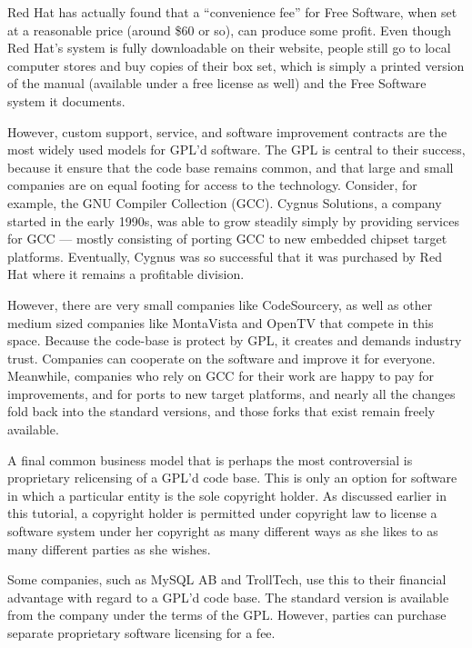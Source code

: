 \documentclass[12pt]{report}
\begin{document}
Red Hat has actually found that a ``convenience fee'' for Free Software,
when set at a reasonable price (around \$60 or so), can produce some
profit.  Even though Red Hat's system is fully downloadable on their
website, people still go to local computer stores and buy copies of their
box set, which is simply a printed version of the manual (available under
a free license as well) and the Free Software system it documents.

\medskip

However, custom support, service, and software improvement contracts are
the most widely used models for GPL'd software.  The GPL is central to
their success, because it ensure that the code base remains common, and
that large and small companies are on equal footing for access to the
technology.  Consider, for example, the GNU Compiler Collection (GCC).
Cygnus Solutions, a company started in the early 1990s, was able to grow
steadily simply by providing services for GCC --- mostly consisting of
porting GCC to new embedded chipset target platforms.  Eventually, Cygnus
was so successful that it was purchased by Red Hat where it remains a
profitable division.

However, there are very small companies like CodeSourcery, as well as
other medium sized companies like MontaVista and OpenTV that compete in
this space.  Because the code-base is protect by GPL, it creates and
demands industry trust.  Companies can cooperate on the software and
improve it for everyone.  Meanwhile, companies who rely on GCC for their
work are happy to pay for improvements, and for ports to new target
platforms, and nearly all the changes fold back into the standard
versions, and those forks that exist remain freely available.

\medskip

\label{Proprietary Relicensing}

A final common business model that is perhaps the most controversial is
proprietary relicensing of a GPL'd code base.  This is only an option for
software in which a particular entity is the sole copyright holder.  As
discussed earlier in this tutorial, a copyright holder is permitted under
copyright law to license a software system under her copyright as many
different ways as she likes to as many different parties as she wishes.

Some companies, such as MySQL AB and TrollTech, use this to their
financial advantage with regard to a GPL'd code base.  The standard
version is available from the company under the terms of the GPL\@.
However, parties can purchase separate proprietary software licensing for
a fee.
\end{document}
